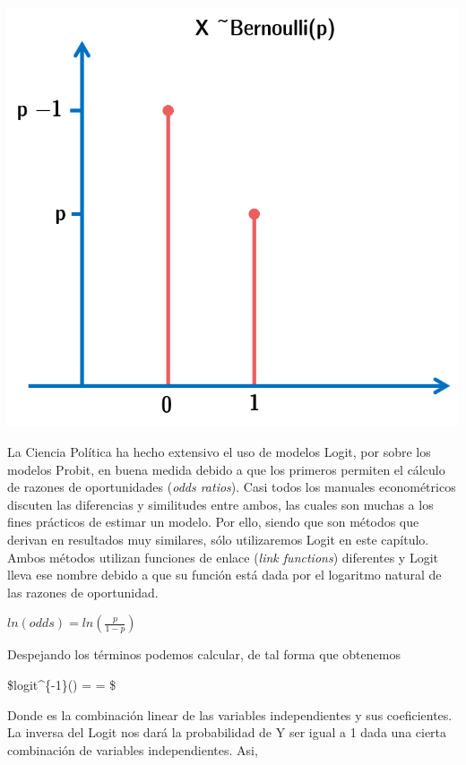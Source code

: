 \documentclass[]{book}
\begin{document}
\includegraphics[width=1.2\linewidth]{00-images/fig_7_2}

La Ciencia Política ha hecho extensivo el uso de modelos Logit, por
sobre los modelos Probit, en buena medida debido a que los primeros
permiten el cálculo de razones de oportunidades (\emph{odds ratios}).
Casi todos los manuales econométricos discuten las diferencias y
similitudes entre ambos, las cuales son muchas a los fines prácticos de
estimar un modelo. Por ello, siendo que son métodos que derivan en
resultados muy similares, sólo utilizaremos Logit en este capítulo.
Ambos métodos utilizan funciones de enlace (\emph{link functions})
diferentes y Logit lleva ese nombre debido a que su función está dada
por el logaritmo natural de las razones de oportunidad.

\(ln(odds) = ln(\frac {p}{1 - p})\)

Despejando los términos podemos calcular, de tal forma que obtenemos

\$logit\^{}\{-1\}(\alpha) =  =
 \$

Donde es la combinación linear de las variables independientes y sus
coeficientes. La inversa del Logit nos dará la probabilidad de Y ser
igual a 1 dada una cierta combinación de variables independientes. Asi,
\end{document}
